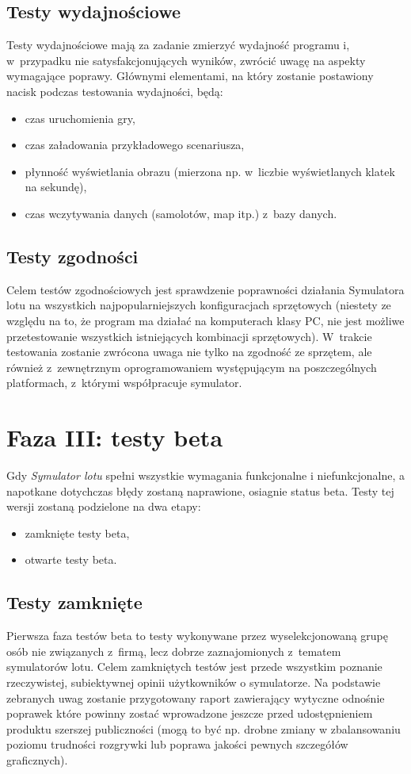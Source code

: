 \documentclass{mwrep}
\begin{document}
\section{Testy wydajnościowe}
Testy wydajnościowe mają za zadanie zmierzyć wydajność programu i, w~przypadku nie satysfakcjonujących wyników, zwrócić uwagę na aspekty wymagające poprawy. Głównymi elementami, na który zostanie postawiony nacisk podczas testowania wydajności, będą:
\begin{itemize}
\item czas uruchomienia gry,
\item czas załadowania przykładowego scenariusza,
\item płynność wyświetlania obrazu (mierzona np. w~liczbie wyświetlanych klatek na sekundę),
\item czas wczytywania danych (samolotów, map itp.) z~bazy danych.
\end{itemize}

\section{Testy zgodności}
Celem testów zgodnościowych jest sprawdzenie poprawności działania Symulatora lotu na wszystkich najpopularniejszych konfiguracjach \linebreak sprzętowych (niestety ze względu na to, że program ma działać na komputerach klasy PC, nie jest możliwe przetestowanie wszystkich istniejących kombinacji sprzętowych). W~trakcie testowania zostanie zwrócona uwaga nie tylko na zgodność ze sprzętem, ale również z~zewnętrznym oprogramowaniem występującym na poszczególnych platformach, z~którymi współpracuje symulator.

\chapter{Faza III: testy beta}
Gdy \textit{Symulator lotu} spełni wszystkie wymagania funkcjonalne i niefunkcjonalne, a napotkane dotychczas błędy zostaną naprawione, osiagnie status beta. Testy tej wersji zostaną podzielone na dwa etapy:
\begin{itemize}
\item zamknięte testy beta,
\item otwarte testy beta.
\end{itemize}

\section{Testy zamknięte}
Pierwsza faza testów beta to testy wykonywane przez wyselekcjonowaną grupę osób nie związanych z~firmą, lecz dobrze zaznajomionych z~tematem symulatorów lotu. Celem zamkniętych testów jest przede wszystkim poznanie rzeczywistej, subiektywnej opinii użytkowników o symulatorze. Na podstawie zebranych uwag zostanie przygotowany raport zawierający wytyczne odnośnie poprawek które powinny zostać wprowadzone jeszcze przed udostępnieniem produktu szerszej publiczności (mogą to być np. drobne zmiany w zbalansowaniu poziomu trudności rozgrywki lub poprawa jakości pewnych szczegółów graficznych).
\end{document}
